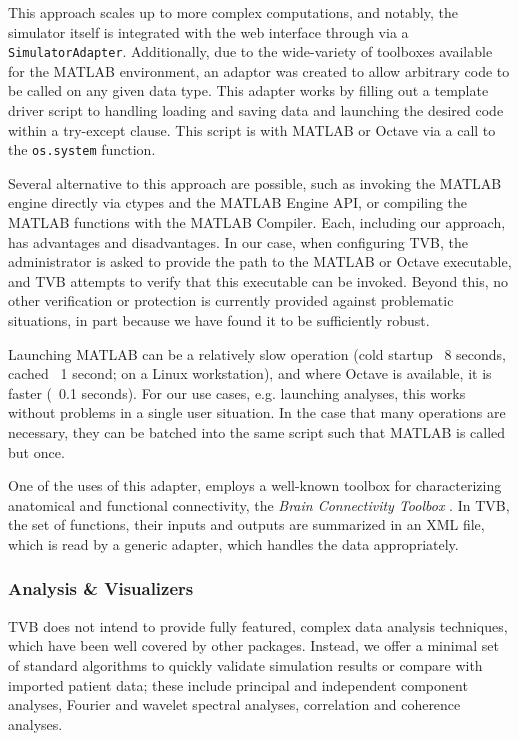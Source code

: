 \documentclass{bioinfo}
\begin{document}
This approach scales up to more complex computations, and notably, the
simulator itself is integrated with the web interface through via a
\texttt{SimulatorAdapter}. Additionally, due to the wide-variety of toolboxes available 
for the MATLAB environment, an adaptor was created to allow arbitrary code
to be called on any given data type. This adapter works by filling out
a template driver script to handling loading and saving data and launching
the desired code within a try-except clause. This script is with MATLAB or
Octave via a call to the \texttt{os.system} function.

Several alternative to this approach are possible, such as invoking the MATLAB
engine directly via ctypes and the MATLAB Engine API, or compiling the MATLAB
functions with the MATLAB Compiler. Each, including our approach, has advantages 
and disadvantages. In our case, when configuring TVB, the administrator is asked
to provide the path to the MATLAB or Octave executable, and TVB attempts to 
verify that this executable can be invoked. Beyond this, no other verification 
or protection is currently provided against problematic situations, in part
because we have found it to be sufficiently robust. 

Launching MATLAB can be a relatively slow operation (cold startup ~8 seconds,
cached ~1 second; on a Linux workstation), and where Octave is available, it is
faster (~0.1 seconds). For our use cases, e.g. launching analyses, this works
without problems in a single user situation. In the case that many operations
are necessary, they can be batched into the same script such that MATLAB is
called but once.

One of the uses of this adapter, employs a well-known toolbox for
characterizing anatomical and functional connectivity, the \emph{Brain
Connectivity Toolbox} \citep{Rubinov_2010}.  In TVB, the set of functions,
their inputs and outputs are summarized in an XML file, which is read by a
generic adapter, which handles the data appropriately.

\subsubsection{Analysis \& Visualizers}

TVB does not intend to provide fully featured, complex data analysis
techniques, which have been well covered by other packages. 
Instead, we offer a minimal set of standard algorithms to quickly
validate simulation results or compare with imported patient data; 
these include principal and independent component analyses, 
Fourier and wavelet spectral analyses, correlation and coherence
analyses.
\end{document}
